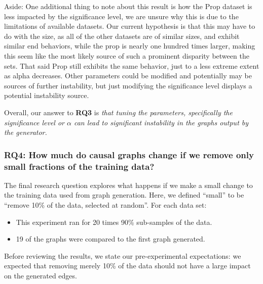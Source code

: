 \documentclass[]{svjour3}
\begin{document}
Aside:  One additional thing to note about this result is how the Prop dataset is less impacted by the significance level, we are unsure why this is due to the limitations of available datasets.  Our current hypothesis is that this may have to do with the size, as all of the other datasets are of similar sizes, and exhibit similar end behaviors, while the prop is nearly one hundred times larger, making this seem like the most likely source of such a prominent disparity between the sets. 
 That said Prop still exhibits the same behavior, just to a less extreme extent as alpha decreases.  Other parameters could be modified and potentially may be sources of further instability, but just modifying the significance level displays a potential instability source.  


Overall, our answer to {\bf RQ3} is {\em that tuning the parameters, specifically the significance level or \(\alpha\) can lead to significant instability in the graphs output by the generator.}

 
\subsubsection{RQ4: How much do causal graphs change if we remove only small fractions
     of the training data?}
The final research question explores what happens if we make a small
change to the training data used from graph generation. 
Here, we defined ``small'' to be ``remove 10\% of the data, selected at random''.
For each data set:
\begin{itemize}
\item This experiment ran for 20 times 90\% sub-samples of the data.
\item 19 of the graphs were compared to the first graph generated.
\end{itemize}
Before reviewing the results, we state our pre-experimental expectations: 
we expected that   removing  merely 10\% of the data should not have a large impact
on the generated edges.
\end{document}
